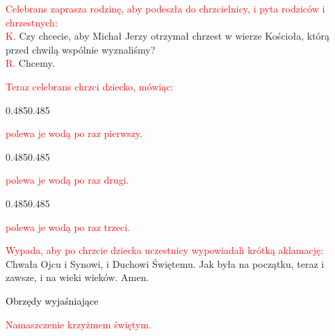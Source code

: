 \documentclass[11pt, a5paper]{extarticle}
\begin{document}
\textcolor{red}{Celebrans zaprasza rodzinę, aby podeszła do chrzcielnicy, i pyta rodziców i chrzestnych:} \\
\textcolor{red}{K.} Czy chcecie, aby Michał Jerzy otrzymał chrzest w wierze Kościoła, którą przed chwilą wspólnie wyznaliśmy? \\
\textcolor{red}{R.} Chcemy.

\begin{center}
\textcolor{red}{Teraz celebrans chrzci dziecko, mówiąc:}
\end{center}

\begin{Parallel}[v]{0.485\textwidth}{0.485\textwidth}
\end{Parallel}

\begin{center}
\textcolor{red}{polewa je wodą po raz pierwszy.}
\end{center}

\begin{Parallel}[v]{0.485\textwidth}{0.485\textwidth}
\end{Parallel}

\begin{center}
\textcolor{red}{polewa je wodą po raz drugi.}
\end{center}

\begin{Parallel}[v]{0.485\textwidth}{0.485\textwidth}
\end{Parallel}

\begin{center}
\textcolor{red}{polewa je wodą po raz trzeci.}
\end{center}


\textcolor{red}{Wypada, aby po chrzcie dziecka uczestnicy wypowiadali krótką aklamację:}\\
Chwała Ojcu i Synowi, i Duchowi Świętemu. Jak była na początku, teraz i zawsze, i na wieki wieków. Amen.

\begin{center}
\Large
\noindent\textcolor{black}{Obrzędy wyjaśniające}
\end{center}

\begin{center}
\textcolor{red}{Namaszczenie krzyżmem świętym.}
\end{center}
\end{document}
